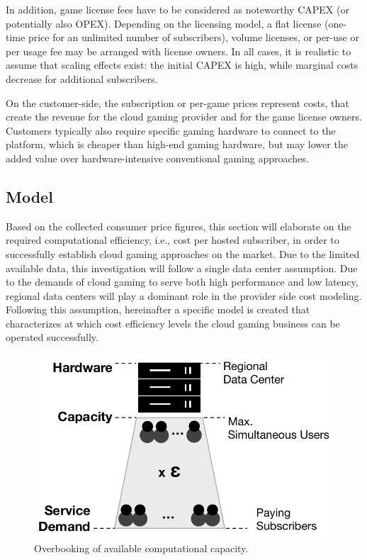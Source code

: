 In addition, game license fees have to be considered as noteworthy \gls{CAPEX} (or potentially also \gls{OPEX}). Depending on the licensing model, a flat license (one-time price for an unlimited number of subscribers), volume licenses, or per-use or per usage fee may be arranged with license owners. In all cases, it is realistic to assume that scaling effects exist: the initial \gls{CAPEX} is high, while marginal costs decrease for additional subscribers.

On the customer-side, the subscription or per-game prices represent costs, that create the revenue for the cloud gaming provider and for the game license owners. Customers typically also require specific gaming hardware to connect to the platform, which is cheaper than high-end gaming hardware, but may lower the added value over hardware-intensive conventional gaming approaches.

\subsection{Model}

Based on the collected consumer price figures, this section will elaborate on the required computational efficiency, i.e., cost per hosted subscriber, in order to successfully establish cloud gaming approaches on the market. Due to the limited available data, this investigation will follow a single data center assumption. Due to the demands of cloud gaming to serve both high performance and low latency, regional data centers will play a dominant role in the provider side cost modeling. Following this assumption, hereinafter a specific model is created that characterizes at which cost efficiency levels the cloud gaming business can be operated successfully.

\begin{figure}[!t]
	\centering
	\includegraphics[width=0.65\columnwidth]{images/overbooking_datacenter.pdf}
	\caption{Overbooking of available computational capacity.}
\label{fig:overbooking_datacenter}
\end{figure}

